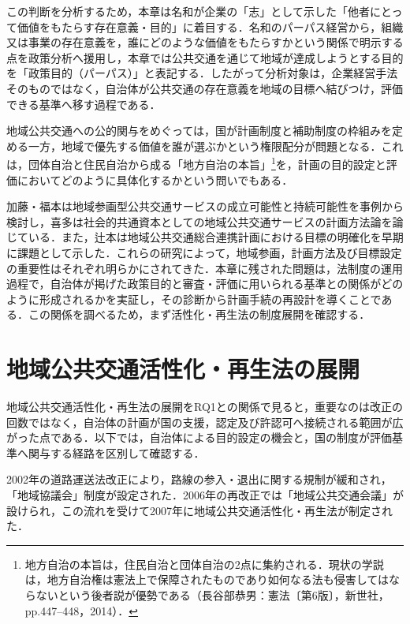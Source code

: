 この判断を分析するため，本章は名和\cite{nawa2021}が企業の「志」として示した「他者にとって価値をもたらす存在意義・目的」に着目する．名和のパーパス経営\cite{nawa2021}から，組織又は事業の存在意義を，誰にどのような価値をもたらすかという関係で明示する点を政策分析へ援用し，本章では公共交通を通じて地域が達成しようとする目的を「政策目的（パーパス）」と表記する．したがって分析対象は，企業経営手法そのものではなく，自治体が公共交通の存在意義を地域の目標へ結びつけ，評価できる基準へ移す過程である．

地域公共交通への公的関与をめぐっては，国が計画制度と補助制度の枠組みを定める一方，地域で優先する価値を誰が選ぶかという権限配分が問題となる．これは，団体自治と住民自治から成る「地方自治の本旨」\footnote{地方自治の本旨は，住民自治と団体自治の2点に集約される．現状の学説は，地方自治権は憲法上で保障されたものであり如何なる法も侵害してはならないという後者説が優勢である（長谷部恭男：憲法〔第6版〕，新世社，pp.447--448，2014）．}を，計画の目的設定と評価においてどのように具体化するかという問いでもある．

加藤・福本\cite{kato2009transport}は地域参画型公共交通サービスの成立可能性と持続可能性を事例から検討し，喜多\cite{kita2022}は社会的共通資本としての地域公共交通サービスの計画方法論を論じている．また，辻本\cite{tsujimoto2010}は地域公共交通総合連携計画における目標の明確化を早期に課題として示した．これらの研究によって，地域参画，計画方法及び目標設定の重要性はそれぞれ明らかにされてきた．本章に残された問題は，法制度の運用過程で，自治体が掲げた政策目的と審査・評価に用いられる基準との関係がどのように形成されるかを実証し，その診断から計画手続の再設計を導くことである．この関係を調べるため，まず活性化・再生法の制度展開を確認する．

\section{地域公共交通活性化・再生法の展開}
\label{sec:ch5_history}

地域公共交通活性化・再生法の展開をRQ1との関係で見ると，重要なのは改正の回数ではなく，自治体の計画が国の支援，認定及び許認可へ接続される範囲が広がった点である．以下では，自治体による目的設定の機会と，国の制度が評価基準へ関与する経路を区別して確認する．

2002年の道路運送法改正により，路線の参入・退出に関する規制が緩和され，「地域協議会」制度が設定された．2006年の再改正では「地域公共交通会議」が設けられ，この流れを受けて2007年に地域公共交通活性化・再生法が制定された．

